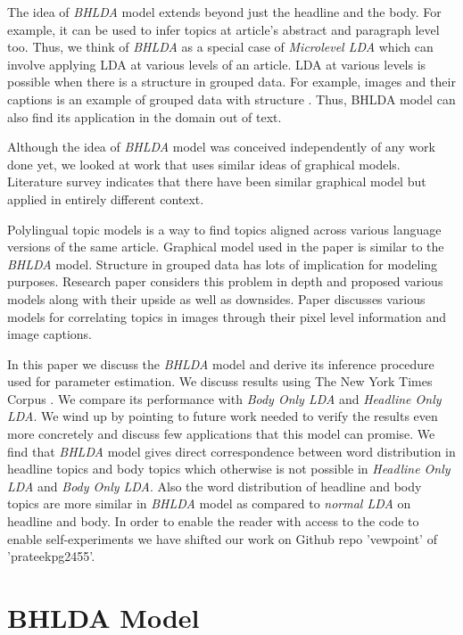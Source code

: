 \documentclass[a4paper]{article}
\begin{document}
The idea of \emph{BHLDA} model extends beyond just the headline and the body. For example, it can be used to infer topics at article's abstract and paragraph level too. Thus, we think of \emph{BHLDA} as a special case of \emph{Microlevel LDA} which can involve applying LDA at various levels of an article. LDA at various levels is possible when there is a structure in grouped data. For example, images and their captions is an example of grouped data with structure \cite{model_annotated_data}. Thus, BHLDA model can also find its application in the domain out of text.

Although the idea of \emph{BHLDA} model was conceived independently of any work done yet, we looked at work that uses similar ideas of graphical models. Literature survey indicates that there have been similar graphical model but applied in entirely different context. 

Polylingual topic models \cite{ptm} is a way to find topics aligned across various language versions of the same article. Graphical model used in the paper is similar to the \emph{BHLDA} model. Structure in grouped data has lots of implication for modeling purposes. Research paper\cite{model_annotated_data} considers this problem in depth and proposed various models along with their upside as well as downsides. Paper discusses various models for correlating topics in images through their pixel level information and image captions.

In this paper we discuss the \emph{BHLDA} model and derive its inference procedure used for parameter estimation. We discuss results using The New York Times Corpus \cite{corpus}.  We compare its performance with \emph{Body Only LDA} and \emph{Headline Only LDA}. We wind up by pointing to future work needed to verify the results even more concretely and discuss few applications that this model can promise. We find that \emph{BHLDA} model gives direct correspondence between word distribution in headline topics and body topics which otherwise is not possible in \emph{Headline Only LDA} and \emph{Body Only LDA}. Also the word distribution of headline and body topics are more similar in \emph{BHLDA} model as compared to \emph{normal LDA} on headline and body. In order to enable the reader with access to the code to enable self-experiments we have shifted our work on Github repo 'vewpoint' of 'prateekpg2455'.

\section{BHLDA Model}
\end{document}
